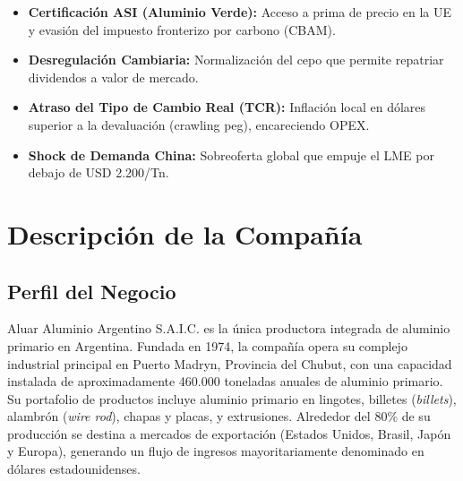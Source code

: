 \documentclass[10pt,a4paper]{article}
\begin{document}
\begin{minipage}[t]{0.43\textwidth}
\begin{tcolorbox}[colback=white, colframe=gsnavy, boxrule=1pt, arc=4pt, left=5pt, right=5pt, top=4pt, bottom=4pt]
    \end{tcolorbox}
\end{minipage}

\vspace{0.25cm}
\noindent
\begin{tcolorbox}[colback=white, colframe=gsblue!40, boxrule=0.5pt, top=3pt, bottom=3pt, left=5pt, right=5pt, title={\small\sffamily \textbf{Catalizadores y Riesgos (12-18m)}}, coltitle=gsnavy]
    \footnotesize
    \begin{itemize}
        \setlength{\itemsep}{0pt}
        \item[\color{aluargreen}$\uparrow$] \textbf{Certificaci\'on ASI (Aluminio Verde):} Acceso a prima de precio en la UE y evasi\'on del impuesto fronterizo por carbono (CBAM).
        \item[\color{aluargreen}$\uparrow$] \textbf{Desregulaci\'on Cambiaria:} Normalizaci\'on del cepo que permite repatriar dividendos a valor de mercado.
        \item[\color{riskred}$\downarrow$] \textbf{Atraso del Tipo de Cambio Real (TCR):} Inflaci\'on local en d\'olares superior a la devaluaci\'on (crawling peg), encareciendo OPEX.
        \item[\color{riskred}$\downarrow$] \textbf{Shock de Demanda China:} Sobreoferta global que empuje el LME por debajo de USD 2.200/Tn.
    \end{itemize}
\end{tcolorbox}

\vspace{0.15cm}

\clearpage
\begingroup
\small
\tableofcontents
\endgroup
\clearpage

\section{Descripción de la Compañía}

\subsection{Perfil del Negocio}
Aluar Aluminio Argentino S.A.I.C. es la única productora integrada de aluminio primario en Argentina. Fundada en 1974, la compañía opera su complejo industrial principal en Puerto Madryn, Provincia del Chubut, con una capacidad instalada de aproximadamente 460.000 toneladas anuales de aluminio primario. Su portafolio de productos incluye aluminio primario en lingotes, billetes (\textit{billets}), alambrón (\textit{wire rod}), chapas y placas, y extrusiones. Alrededor del 80\% de su producción se destina a mercados de exportación (Estados Unidos, Brasil, Japón y Europa), generando un flujo de ingresos mayoritariamente denominado en dólares estadounidenses.
\end{document}
